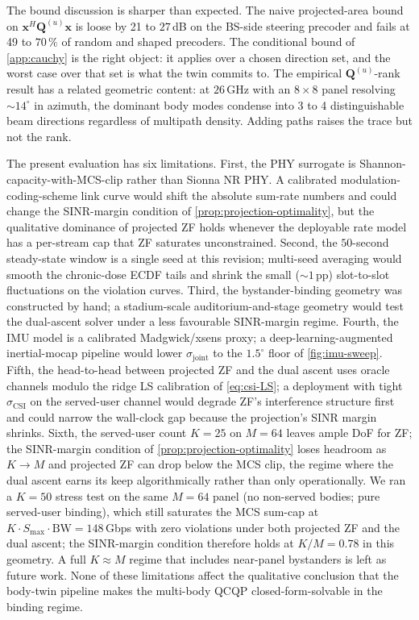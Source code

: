 \documentclass[journal,twocolumn,10pt]{IEEEtran}
\theoremstyle{plain}
\theoremstyle{remark}
\newcommand{\xx}{\mathbf{x}}
\newcommand{\Qmat}{\mathbf{Q}}
\begin{document}
The bound discussion is sharper than expected. The naive
projected-area bound on $\xx^H \Qmat^{(u)} \xx$ is loose by 21 to
$27\,$dB on the BS-side steering precoder and fails at 49 to
$70\,\%$ of random and shaped precoders. The conditional bound of
\cref{app:cauchy} is the right object: it applies over a chosen
direction set, and the worst case over that set is what the twin
commits to. The empirical $\Qmat^{(u)}$-rank result has a related
geometric content: at $26\,$GHz with an $8\times 8$ panel resolving
$\sim 14^\circ$ in azimuth, the dominant body modes condense into
3 to 4 distinguishable beam directions regardless of multipath
density. Adding paths raises the trace but not the rank.

The present evaluation has six limitations. First, the PHY
surrogate is Shannon-capacity-with-MCS-clip rather than Sionna NR
PHY. A calibrated modulation-coding-scheme link curve would shift
the absolute sum-rate numbers and could change the
SINR-margin condition of \cref{prop:projection-optimality}, but
the qualitative dominance of projected ZF holds whenever the
deployable rate model has a per-stream cap that ZF saturates
unconstrained. Second, the $50$-second steady-state window is a
single seed at this revision; multi-seed averaging would smooth
the chronic-dose ECDF tails and shrink the small ($\sim 1\,$pp)
slot-to-slot fluctuations on the violation curves. Third, the
bystander-binding geometry was constructed by hand; a
stadium-scale auditorium-and-stage geometry would test the
dual-ascent solver under a less favourable SINR-margin regime.
Fourth, the IMU model is a calibrated Madgwick/xsens proxy; a
deep-learning-augmented inertial-mocap pipeline would lower
$\sigma_{\mathrm{joint}}$ to the $1.5^\circ$ floor of
\cref{fig:imu-sweep}. Fifth, the head-to-head between projected
ZF and the dual ascent uses oracle channels modulo the ridge LS
calibration of \cref{eq:csi-LS}; a deployment with tight
$\sigma_{\mathrm{CSI}}$ on the served-user channel would degrade
ZF's interference structure first and could narrow the wall-clock
gap because the projection's SINR margin shrinks. Sixth, the
served-user count $K = 25$ on $M = 64$ leaves ample DoF for ZF;
the SINR-margin condition of \cref{prop:projection-optimality}
loses headroom as $K \to M$ and projected ZF can drop below the
MCS clip, the regime where the dual ascent earns its keep
algorithmically rather than only operationally. We ran a
$K = 50$ stress test on the same $M = 64$ panel (no
non-served bodies; pure served-user binding), which still
saturates the MCS sum-cap at $K \cdot S_{\max} \cdot \mathrm{BW}
= 148\,$Gbps with zero violations under both projected ZF and
the dual ascent; the SINR-margin condition therefore holds at
$K/M = 0.78$ in this geometry. A full $K \approx M$ regime that
includes near-panel bystanders is left as future work. None of these
limitations affect the qualitative conclusion that the body-twin
pipeline makes the multi-body QCQP closed-form-solvable in the
binding regime.
\end{document}

